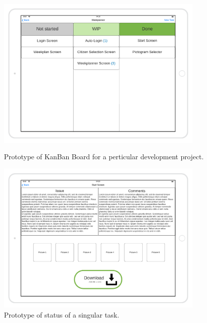 \begin{figure}[H]
    \centering
    \begin{minipage}{0.45\textwidth}
        \centering
        \includegraphics[width=0.9\textwidth]{images/KanBan-mockup.png}
        \caption{Prototype of KanBan Board for a perticular development project.}
    \end{minipage}\hfill
    \begin{minipage}{0.45\textwidth}
        \centering
        \includegraphics[width=0.9\textwidth]{images/view-a-task-mockup.png}
        \caption{Prototype of status of a singular task.}
    \end{minipage}
\end{figure}

